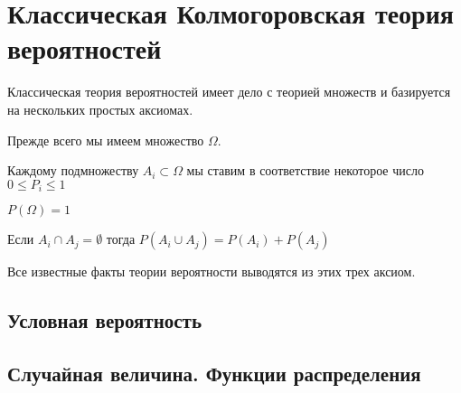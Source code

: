 \section{Классическая Колмогоровская теория вероятностей}

Классическая теория вероятностей имеет дело с теорией множеств и
базируется на нескольких простых аксиомах. 

Прежде всего мы имеем множество $\Omega$.
\begin{axiom}
\label{axProbabilityKolmogorov1}
Каждому подмножеству $A_i \subset \Omega$ мы ставим в соответствие
некоторое число $0 \le P_i \le 1$
\end{axiom}

\begin{axiom}
\label{axProbabilityKolmogorov2}
$P\left(\Omega\right) = 1$
\end{axiom}

\begin{axiom}
\label{axProbabilityKolmogorov3}
Если $A_i \cap A_j = \emptyset$ тогда 
$P\left(A_i \cup A_j\right) = P\left(A_i\right) + P\left(A_j\right)$
\end{axiom}

Все известные факты теории вероятности выводятся из этих трех аксиом.  


\subsection{Условная вероятность}

\subsection{Случайная величина. Функции распределения}


